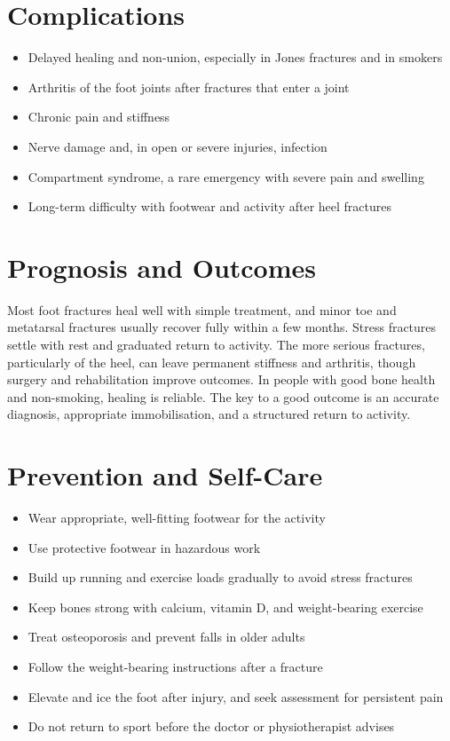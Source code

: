 \section*{Complications}
\begin{itemize}
    \item Delayed healing and non-union, especially in Jones fractures and in smokers
    \item Arthritis of the foot joints after fractures that enter a joint
    \item Chronic pain and stiffness
    \item Nerve damage and, in open or severe injuries, infection
    \item Compartment syndrome, a rare emergency with severe pain and swelling
    \item Long-term difficulty with footwear and activity after heel fractures
\end{itemize}

\section*{Prognosis and Outcomes}
Most foot fractures heal well with simple treatment, and minor toe and metatarsal fractures usually recover fully within a few months. Stress fractures settle with rest and graduated return to activity. The more serious fractures, particularly of the heel, can leave permanent stiffness and arthritis, though surgery and rehabilitation improve outcomes. In people with good bone health and non-smoking, healing is reliable. The key to a good outcome is an accurate diagnosis, appropriate immobilisation, and a structured return to activity.

\section*{Prevention and Self-Care}
\begin{itemize}
    \item Wear appropriate, well-fitting footwear for the activity
    \item Use protective footwear in hazardous work
    \item Build up running and exercise loads gradually to avoid stress fractures
    \item Keep bones strong with calcium, vitamin D, and weight-bearing exercise
    \item Treat osteoporosis and prevent falls in older adults
    \item Follow the weight-bearing instructions after a fracture
    \item Elevate and ice the foot after injury, and seek assessment for persistent pain
    \item Do not return to sport before the doctor or physiotherapist advises
\end{itemize}

